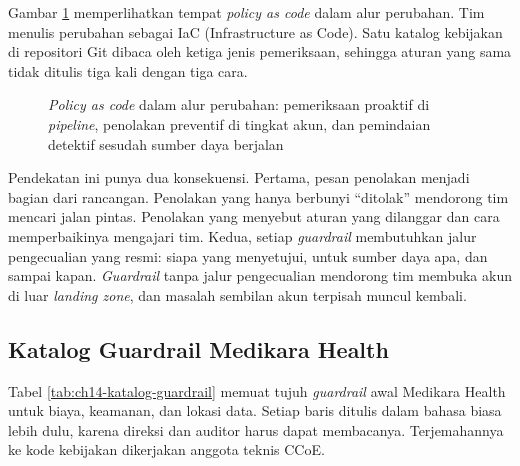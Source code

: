 Gambar \ref{fig:ch14-guardrail-pac} memperlihatkan tempat \textit{policy as code} dalam alur
perubahan. Tim menulis perubahan sebagai IaC (Infrastructure as Code). Satu katalog kebijakan di
repositori Git dibaca oleh ketiga jenis pemeriksaan, sehingga aturan yang sama tidak ditulis tiga
kali dengan tiga cara.

\begin{figure}[!htb]
  \centering
  
  \caption{\textit{Policy as code} dalam alur perubahan: pemeriksaan proaktif di
           \textit{pipeline}, penolakan preventif di tingkat akun, dan pemindaian detektif sesudah
           sumber daya berjalan}
  \label{fig:ch14-guardrail-pac}
\end{figure}

Pendekatan ini punya dua konsekuensi. Pertama, pesan penolakan menjadi bagian dari rancangan.
Penolakan yang hanya berbunyi ``ditolak'' mendorong tim mencari jalan pintas. Penolakan yang
menyebut aturan yang dilanggar dan cara memperbaikinya mengajari tim. Kedua, setiap
\textit{guardrail} membutuhkan jalur pengecualian yang resmi: siapa yang menyetujui, untuk sumber
daya apa, dan sampai kapan. \textit{Guardrail} tanpa jalur pengecualian mendorong tim membuka akun
di luar \textit{landing zone}, dan masalah sembilan akun terpisah muncul kembali.

\subsection{Katalog Guardrail Medikara Health}

Tabel \ref{tab:ch14-katalog-guardrail} memuat tujuh \textit{guardrail} awal Medikara Health untuk
biaya, keamanan, dan lokasi data. Setiap baris ditulis dalam bahasa biasa lebih dulu, karena
direksi dan auditor harus dapat membacanya. Terjemahannya ke kode kebijakan dikerjakan anggota
teknis CCoE.

